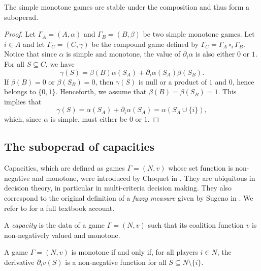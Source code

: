 \documentclass[a4paper,12pt]{amsart}
\begin{document}
\begin{proposition}\label{prop: simple games suboperad}
The simple monotone games are stable under the composition and thus form a suboperad. 
\end{proposition}

\begin{proof}
    Let \(\Gamma_A = (A, \alpha) \) and \(\Gamma_B = (B, \beta)\) be two simple monotone games. Let \(i \in A\) and let \(\Gamma_C = (C, \gamma)\) be the compound game defined by \(\Gamma_C = \Gamma_A \circ_i \Gamma_B\). Notice that since $\alpha$ is simple and monotone, the value of $\partial_i \alpha$ is also either $0$  or $1$. For all \(S \subseteq C\), we have 
    \[
    \gamma(S) = \beta(B) \alpha(S_A) + \partial_i \alpha(S_A) \beta(S_B).
    \]
    If \(\beta(B) = 0\) or \(\beta(S_B) = 0\), then \(\gamma(S)\) is null or a product of \(1\) and \(0\), hence belongs to \(\{0, 1\}\). Henceforth, we assume that \(\beta(B) = \beta(S_B) = 1\). This implies that 
    \[
    \gamma(S) = \alpha(S_A) + \partial_i \alpha(S_A) = \alpha(S_A \cup \{i\}), 
    \]
    which, since $\alpha$ is simple, must either be $0$ or $1$.
\end{proof}

\subsection{The suboperad of capacities}
Capacities, which are defined as games $\Gamma = (N,v)$ whose set function is non-negative and monotone, were introduced by Choquet in \cite{choquet1954theory}. They are ubiquitous in decision theory, in particular in multi-criteria decision making. They also correspond to the original definition of a \textit{fuzzy measure} given by Sugeno in \cite{Sugeno}. We refer to \cite[Section 2.3 and Chapter 6]{Grabisch} for a full textbook account. 

\begin{definition}[Capacity]\label{def: capacity}
A \textit{capacity} is the data of a game $\Gamma = (N,v)$ such that its coalition function $v$ is non-negatively valued and monotone. 
\end{definition}

\begin{remark}
A game $\Gamma = (N,v)$ is monotone if and only if, for all players $i \in N$, the derivative $\partial_i v(S)$ is a non-negative function for all $S \subseteq N \setminus \{i\}$. 
\end{remark}
\end{document}
